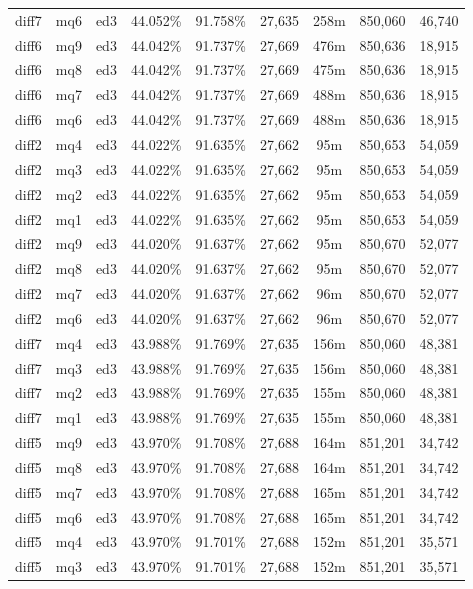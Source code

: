 \begin{landscape}
\begin{longtable}{|c|c|c||c|c||c|c|c|c|}
diff7 & mq6 & ed3 & 44.052\% & 91.758\% & 27,635 & 258m & 850,060 & 46,740 \\
diff6 & mq9 & ed3 & 44.042\% & 91.737\% & 27,669 & 476m & 850,636 & 18,915 \\
diff6 & mq8 & ed3 & 44.042\% & 91.737\% & 27,669 & 475m & 850,636 & 18,915 \\
diff6 & mq7 & ed3 & 44.042\% & 91.737\% & 27,669 & 488m & 850,636 & 18,915 \\
diff6 & mq6 & ed3 & 44.042\% & 91.737\% & 27,669 & 488m & 850,636 & 18,915 \\
diff2 & mq4 & ed3 & 44.022\% & 91.635\% & 27,662 & 95m & 850,653 & 54,059 \\
diff2 & mq3 & ed3 & 44.022\% & 91.635\% & 27,662 & 95m & 850,653 & 54,059 \\
diff2 & mq2 & ed3 & 44.022\% & 91.635\% & 27,662 & 95m & 850,653 & 54,059 \\
diff2 & mq1 & ed3 & 44.022\% & 91.635\% & 27,662 & 95m & 850,653 & 54,059 \\
diff2 & mq9 & ed3 & 44.020\% & 91.637\% & 27,662 & 95m & 850,670 & 52,077 \\
diff2 & mq8 & ed3 & 44.020\% & 91.637\% & 27,662 & 95m & 850,670 & 52,077 \\
diff2 & mq7 & ed3 & 44.020\% & 91.637\% & 27,662 & 96m & 850,670 & 52,077 \\
diff2 & mq6 & ed3 & 44.020\% & 91.637\% & 27,662 & 96m & 850,670 & 52,077 \\
diff7 & mq4 & ed3 & 43.988\% & 91.769\% & 27,635 & 156m & 850,060 & 48,381 \\
diff7 & mq3 & ed3 & 43.988\% & 91.769\% & 27,635 & 156m & 850,060 & 48,381 \\
diff7 & mq2 & ed3 & 43.988\% & 91.769\% & 27,635 & 155m & 850,060 & 48,381 \\
diff7 & mq1 & ed3 & 43.988\% & 91.769\% & 27,635 & 155m & 850,060 & 48,381 \\
diff5 & mq9 & ed3 & 43.970\% & 91.708\% & 27,688 & 164m & 851,201 & 34,742 \\
diff5 & mq8 & ed3 & 43.970\% & 91.708\% & 27,688 & 164m & 851,201 & 34,742 \\
diff5 & mq7 & ed3 & 43.970\% & 91.708\% & 27,688 & 165m & 851,201 & 34,742 \\
diff5 & mq6 & ed3 & 43.970\% & 91.708\% & 27,688 & 165m & 851,201 & 34,742 \\
diff5 & mq4 & ed3 & 43.970\% & 91.701\% & 27,688 & 152m & 851,201 & 35,571 \\
diff5 & mq3 & ed3 & 43.970\% & 91.701\% & 27,688 & 152m & 851,201 & 35,571 \\

\end{longtable}
\end{landscape}
